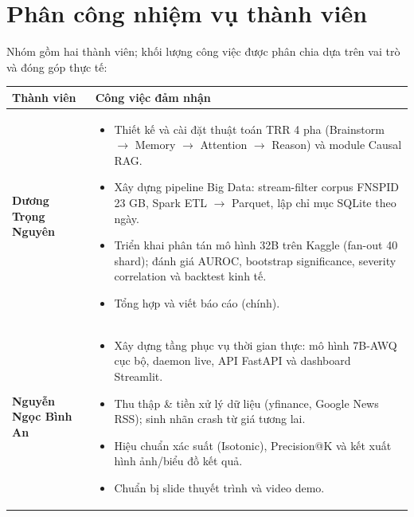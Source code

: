 \documentclass[11pt, a4paper]{article}
\begin{document}

\section*{Phân công nhiệm vụ thành viên}
Nhóm gồm hai thành viên; khối lượng công việc được phân chia dựa trên vai trò và đóng góp thực tế:

\begin{table}[H]
    \centering
    \renewcommand{\arraystretch}{1.3}
    \begin{tabularx}{\textwidth}{@{} >{\raggedright\arraybackslash}p{3.5cm} X @{}}
    \toprule
    \textbf{Thành viên} & \textbf{Công việc đảm nhận} \\
    \midrule
    \textbf{Dương Trọng Nguyên} &
    \begin{itemize}[leftmargin=1.2em, nosep]
        \item Thiết kế và cài đặt thuật toán TRR 4 pha (Brainstorm $\rightarrow$ Memory $\rightarrow$ Attention $\rightarrow$ Reason) và module Causal RAG.
        \item Xây dựng pipeline Big Data: stream-filter corpus FNSPID 23 GB, Spark ETL $\rightarrow$ Parquet, lập chỉ mục SQLite theo ngày.
        \item Triển khai phân tán mô hình 32B trên Kaggle (fan-out 40 shard); đánh giá AUROC, bootstrap significance, severity correlation và backtest kinh tế.
        \item Tổng hợp và viết báo cáo (chính).
    \end{itemize} \\
    \midrule
    \textbf{Nguyễn Ngọc Bình An} &
    \begin{itemize}[leftmargin=1.2em, nosep]
        \item Xây dựng tầng phục vụ thời gian thực: mô hình 7B-AWQ cục bộ, daemon live, API FastAPI và dashboard Streamlit.
        \item Thu thập \& tiền xử lý dữ liệu (yfinance, Google News RSS); sinh nhãn crash từ giá tương lai.
        \item Hiệu chuẩn xác suất (Isotonic), Precision@K và kết xuất hình ảnh/biểu đồ kết quả.
        \item Chuẩn bị slide thuyết trình và video demo.
    \end{itemize} \\
    \bottomrule
    \end{tabularx}
\end{table}
\end{document}
